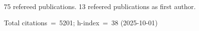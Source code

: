 75 refereed publications. 13 refeered publications as first author.

Total citations~=~5201; h-index~=~38 (2025-10-01)